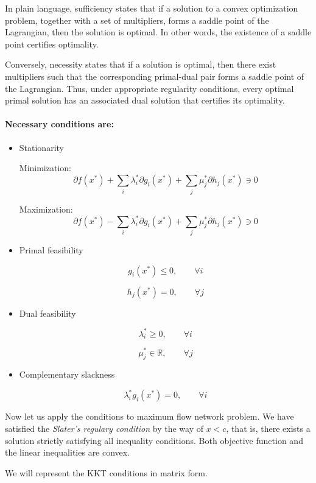 \documentclass[12pt, openany]{article}
\begin{document}
In plain language, sufficiency states that if a solution to a convex optimization problem, together with a set of multipliers, forms a saddle point of the Lagrangian, then the solution is optimal. In other words, the existence of a saddle point certifies optimality.

Conversely, necessity states that if a solution is optimal, then there exist multipliers such that the corresponding primal-dual pair forms a saddle point of the Lagrangian. Thus, under appropriate regularity conditions, every optimal primal solution has an associated dual solution that certifies its optimality.

\paragraph{Necessary conditions are:}
\begin{itemize}
\item Stationarity

Minimization:
\[
\partial f(x^*)+\sum_i \lambda_i^*\partial g_i(x^*)+\sum_j \mu_j^*\partial h_j(x^*) \ni 0
\]

Maximization:
\[
\partial f(x^*)-\sum_i \lambda_i^*\partial g_i(x^*)+\sum_j \mu_j^*\partial h_j(x^*) \ni 0
\]

\item Primal feasibility

\[
g_i(x^*)\le 0,\qquad \forall i
\]

\[
h_j(x^*)=0,\qquad \forall j
\]

\item Dual feasibility

\[
\lambda_i^*\ge 0,\qquad \forall i
\]

\[
\mu_j^* \in \mathbb{R},\qquad \forall j
\]

\item Complementary slackness

\[
\lambda_i^* g_i(x^*)=0,\qquad \forall i
\]
\end{itemize}

Now let us apply the conditions to maximum flow network problem. We have satisfied the \textit{Slater's regulary condition} by the way of \(x <  c\), that is, there exists a solution strictly satisfying all inequality conditions. Both objective function and the linear inequalities are convex.

We will represent the KKT conditions in matrix form.
\end{document}
